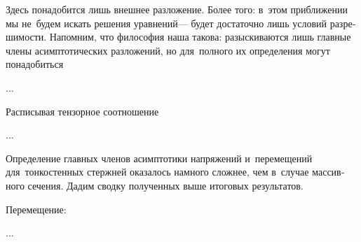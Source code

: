 

\begin{otherlanguage}{russian}

Здесь понадобится лишь внешнее разложение. Более того: в~этом приближении мы не~будем искать решения уравнений\:--- будет достаточно лишь условий разрешимости. Напомним, что философия наша такова: разыскиваются лишь главные члены асимптотических разложений, но для~полного их определения могут понадобиться

...



\end{otherlanguage}



\begin{otherlanguage}{russian}

Расписывая тензорное соотношение

...



\end{otherlanguage}



\begin{otherlanguage}{russian}

Определение главных членов асимптотики напряжений и~перемещений для~тонкостенных стержней оказалось намного сложнее, чем в~случае массивного сечения. Дадим сводку полученных выше итоговых результатов.

Перемещение:

...




\end{otherlanguage}

